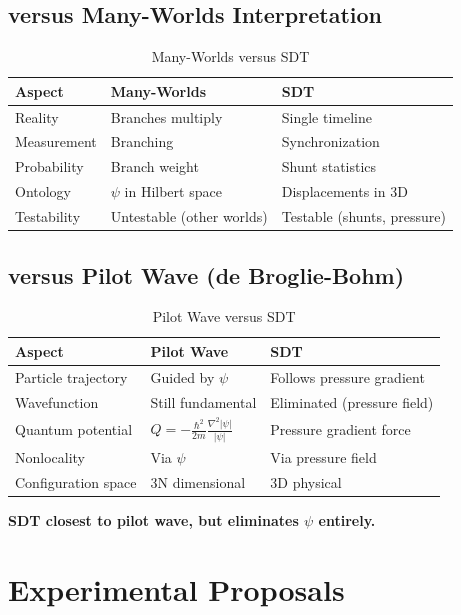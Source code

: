 \subsection{versus Many-Worlds Interpretation}

\begin{table}[h]
\centering
\begin{tabular}{|l|l|l|}
\hline
\textbf{Aspect} & \textbf{Many-Worlds} & \textbf{SDT} \\
\hline
Reality & Branches multiply & Single timeline \\
Measurement & Branching & Synchronization \\
Probability & Branch weight & Shunt statistics \\
Ontology & $\psi$ in Hilbert space & Displacements in 3D \\
Testability & Untestable (other worlds) & Testable (shunts, pressure) \\
\hline
\end{tabular}
\caption{Many-Worlds versus SDT}
\end{table}

\subsection{versus Pilot Wave (de Broglie-Bohm)}

\begin{table}[h]
\centering
\begin{tabular}{|l|l|l|}
\hline
\textbf{Aspect} & \textbf{Pilot Wave} & \textbf{SDT} \\
\hline
Particle trajectory & Guided by $\psi$ & Follows pressure gradient \\
Wavefunction & Still fundamental & Eliminated (pressure field) \\
Quantum potential & $Q = -\frac{\hbar^2}{2m}\frac{\nabla^2|\psi|}{|\psi|}$ & Pressure gradient force \\
Nonlocality & Via $\psi$ & Via pressure field \\
Configuration space & 3N dimensional & 3D physical \\
\hline
\end{tabular}
\caption{Pilot Wave versus SDT}
\end{table}

\textbf{SDT closest to pilot wave, but eliminates $\psi$ entirely.}

\section{Experimental Proposals}


